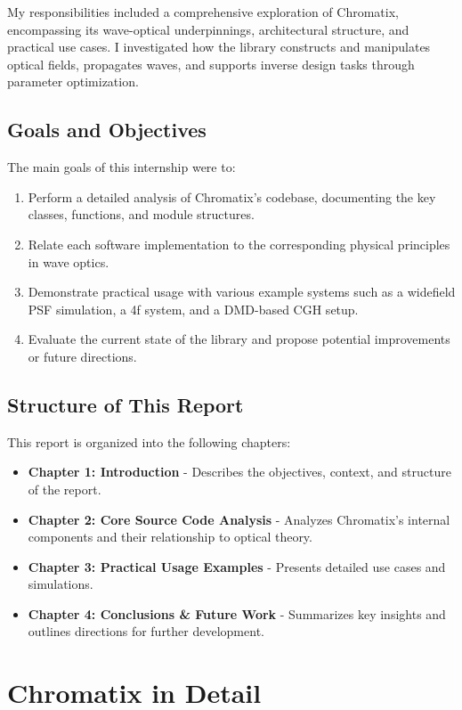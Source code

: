 \documentclass[a4paper,12pt]{report}
\begin{document}
My responsibilities included a comprehensive exploration of Chromatix, encompassing its wave-optical underpinnings, architectural structure, and practical use cases. I investigated how the library constructs and manipulates optical fields, propagates waves, and supports inverse design tasks through parameter optimization.

\section{Goals and Objectives}
The main goals of this internship were to:
\begin{enumerate}
    \item Perform a detailed analysis of Chromatix's codebase, documenting the key classes, functions, and module structures.
    \item Relate each software implementation to the corresponding physical principles in wave optics.
    \item Demonstrate practical usage with various example systems such as a widefield PSF simulation, a 4f system, and a DMD-based CGH setup.
    \item Evaluate the current state of the library and propose potential improvements or future directions.
\end{enumerate}

\section{Structure of This Report}
This report is organized into the following chapters:
\begin{itemize}
    \item \textbf{Chapter 1: Introduction} - Describes the objectives, context, and structure of the report.
    \item \textbf{Chapter 2: Core Source Code Analysis} - Analyzes Chromatix's internal components and their relationship to optical theory.
    \item \textbf{Chapter 3: Practical Usage Examples} - Presents detailed use cases and simulations.
    \item \textbf{Chapter 4: Conclusions \& Future Work} - Summarizes key insights and outlines directions for further development.
\end{itemize}

\chapter{Chromatix in Detail}
\end{document}
